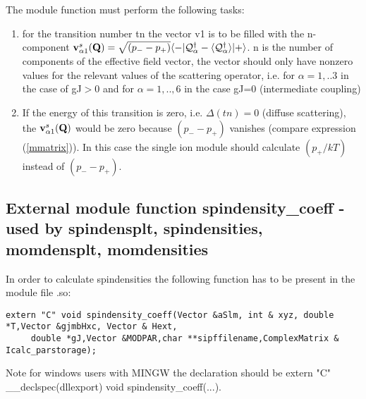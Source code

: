 The module function must perform the following tasks:
\begin{enumerate}
\item for the transition number tn the vector v1  is to be filled with the n-component 
 ${\mathbf v^s_{\alpha1}}(\mathbf Q)=
\sqrt{(p_--p_+)}
\langle -|\mathcal Q^{\dag}_{\alpha}-\langle \mathcal Q^{\dag}_{\alpha}\rangle|+\rangle$.
n is the number of components of the effective field vector, the vector
should only have nonzero values for the relevant values of
the scattering operator, i.e. for $\alpha=1,..3$ in the case of
gJ$>$0 and for $\alpha=1,..,6$ in the case gJ=0 (intermediate coupling)
\item
If the energy of this transition
is zero, i.e. $\Delta(tn)=0$ (diffuse scattering), 
the ${\mathbf v^s_{\alpha1}}(\mathbf Q)$ 
 would be zero because $(p_--p_+)$ vanishes (compare expression (\ref{mmatrix})).
In this case the single ion module should calculate $(p_+/kT)$ instead of $(p_--p_+)$.
\end{enumerate}

\subsection{External module function {\prg spindensity\_coeff} -
used by {\prg spindensplt},
{\prg spindensities},
{\prg momdensplt},
{\prg momdensities}}

In order to calculate spindensities
the following function has to be
present in the module file {\prg *.so}:

\begin{verbatim}
extern "C" void spindensity_coeff(Vector &aSlm, int & xyz, double *T,Vector &gjmbHxc, Vector & Hext,
     double *gJ,Vector &MODPAR,char **sipffilename,ComplexMatrix & Icalc_parstorage);
\end{verbatim}

Note for windows users with MINGW the declaration should be {\prg extern "C" \_\_declspec(dllexport) void %
spindensity\_coeff(...)}.

